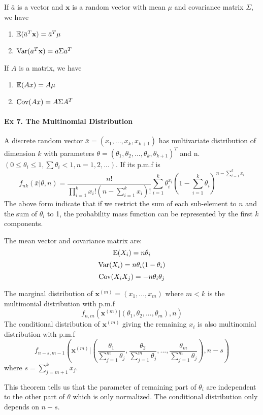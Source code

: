 	\begin{lemma}
		If $\bar{a}$ is a vector and $\textbf{x}$ is a random vector with mean $\mu$ and covariance matrix $\Sigma$, we have 
		\begin{enumerate}
			\item $\mathbb{E} (\bar{a}^T\textbf{x}) = \bar{a}^T \mu$
			\item $\mathrm{Var}(\bar{a}^T\textbf{x}) = \bar{a}\Sigma\bar{a}^T$
		\end{enumerate} 
	If $A$ is a matrix, we have 
		\begin{enumerate}
			\item $\mathbb{E}(Ax) = A\mu$
			\item $\mathrm{Cov}(Ax) = A\Sigma A^T$
		\end{enumerate}
	\end{lemma}
	
	\paragraph{Ex 7. The Multinomial Distribution}
	A discrete random vector $\bar{x} = (x_1,..., x_k,x_{k+1})$ has multivariate distribution of dimension $k$ with parameters $\theta = (\theta_1, \theta_2,...,\theta_k,\theta_{k+1} )^T$ and n. $(0\leq \theta_i\leq 1, \sum \theta_i<1, n=1,2,...)$. If its p.m.f is 
	$$f_{nk}(\bar{x}|\theta,n) = \frac{n!}{\prod_{i=1}^{k}x_i!\left(
		n - \sum_{i=1}^{k}x_i
		\right)!}
	\sum_{i=1}^{k}\theta_i^{x_i}\left(1 - \sum_{i=1}^{k}\theta_i\right)^{n - \sum_{i=1}^{k}x_i}
	$$
	The above form indicate that if we restrict the sum of each sub-element to $n$ and the sum of $\theta_i$ to 1, the probability mass function can be represented by the first $k$ components.
	
	
	The mean vector and covariance matrix are:
	$$\mathbb{E}(X_i) = n\theta_i$$
	$$\mathrm{Var}(X_i) = n\theta_i (1-\theta_i)$$
	$$\mathrm{Cov}(X_i X_j) = -n\theta_i \theta_j$$

	
	\begin{theorem}
		The marginal distribution of $\textbf{x}^{(m)} = (x_1,...,x_m)$ where $m < k$ is the multimonial distribution with p.m.f
		\begin{equation}
			f_{n,m}(\textbf{x}^{(m)}|(\theta_1,\theta_2,...,\theta_m),n)
		\end{equation}
		 The conditional distribution of $\textbf{x}^{(m)}$ giving the remaining $x_i$ is also multinomial distribution with p.m.f
		\begin{equation}
			f_{n-s,m-1} \left(\textbf{x}^{(m)}|\left(\frac{\theta_1}{\sum_{j = 1}^{m}\theta_j}, \frac{\theta_2}{\sum_{j = 1}^{m}\theta_j},..., \frac{\theta_m}{\sum_{j = 1}^{m}\theta_j}\right),n-s\right)
		\end{equation}
		 where $s = \sum_{j = m+1}^{k}x_j$.
	\end{theorem}
	This theorem tells us that the parameter of remaining part of $\theta_i$ are independent to the other part of $\theta$ which is only normalized. The conditional distribution only depends on $n-s$. 

